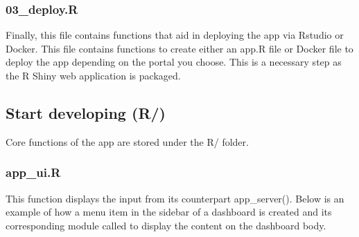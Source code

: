 \documentclass[]{article}
\newenvironment{Shaded}{\begin{snugshade}}{\end{snugshade}}
\newcommand{\CommentTok}[1]{\textcolor[rgb]{0.56,0.35,0.01}{\textit{#1}}}
\newcommand{\ControlFlowTok}[1]{\textcolor[rgb]{0.13,0.29,0.53}{\textbf{#1}}}
\newcommand{\DataTypeTok}[1]{\textcolor[rgb]{0.13,0.29,0.53}{#1}}
\newcommand{\DecValTok}[1]{\textcolor[rgb]{0.00,0.00,0.81}{#1}}
\newcommand{\KeywordTok}[1]{\textcolor[rgb]{0.13,0.29,0.53}{\textbf{#1}}}
\newcommand{\NormalTok}[1]{#1}
\newcommand{\OperatorTok}[1]{\textcolor[rgb]{0.81,0.36,0.00}{\textbf{#1}}}
\newcommand{\StringTok}[1]{\textcolor[rgb]{0.31,0.60,0.02}{#1}}
\begin{document}
\hypertarget{deploy.r}{%
\subsubsection{03\_deploy.R}\label{deploy.r}}

Finally, this file contains functions that aid in deploying the app via
Rstudio or Docker. This file contains functions to create either an
app.R file or Docker file to deploy the app depending on the portal you
choose. This is a necessary step as the R Shiny web application is
packaged.

\hypertarget{start-developing-r}{%
\subsection{\texorpdfstring{\textbf{Start developing}
(R/)}{Start developing (R/)}}\label{start-developing-r}}

Core functions of the app are stored under the R/ folder.

\hypertarget{app_ui.r}{%
\subsubsection{app\_ui.R}\label{app_ui.r}}

This function displays the input from its counterpart app\_server().
Below is an example of how a menu item in the sidebar of a dashboard is
created and its corresponding module called to display the content on
the dashboard body.

\begin{Shaded}
\end{Shaded}
\end{document}
